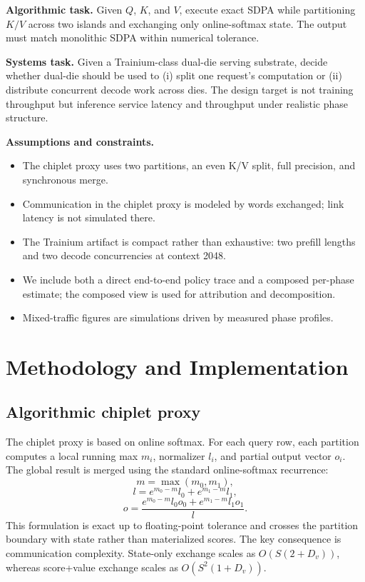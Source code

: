 \documentclass[10pt]{article}
\begin{document}
\textbf{Algorithmic task.} Given $Q$, $K$, and $V$, execute exact SDPA while partitioning $K/V$ across two islands and exchanging only online-softmax state. The output must match monolithic SDPA within numerical tolerance.

\textbf{Systems task.} Given a Trainium-class dual-die serving substrate, decide whether dual-die should be used to (i) split one request's computation or (ii) distribute concurrent decode work across dies. The design target is not training throughput but inference service latency and throughput under realistic phase structure.

\textbf{Assumptions and constraints.}
\begin{itemize}[leftmargin=1.3em]
  \item The chiplet proxy uses two partitions, an even K/V split, full precision, and synchronous merge.
  \item Communication in the chiplet proxy is modeled by words exchanged; link latency is not simulated there.
  \item The Trainium artifact is compact rather than exhaustive: two prefill lengths and two decode concurrencies at context 2048.
  \item We include both a direct end-to-end policy trace and a composed per-phase estimate; the composed view is used for attribution and decomposition.
  \item Mixed-traffic figures are simulations driven by measured phase profiles.
\end{itemize}

\section{Methodology and Implementation}
\subsection{Algorithmic chiplet proxy}
The chiplet proxy is based on online softmax. For each query row, each partition computes a local running max $m_i$, normalizer $l_i$, and partial output vector $o_i$. The global result is merged using the standard online-softmax recurrence:
\begin{equation}
  m = \max(m_0, m_1),
\end{equation}
\begin{equation}
  l = e^{m_0-m} l_0 + e^{m_1-m} l_1,
\end{equation}
\begin{equation}
  o = \frac{e^{m_0-m} l_0 o_0 + e^{m_1-m} l_1 o_1}{l}.
\end{equation}
This formulation is exact up to floating-point tolerance and crosses the partition boundary with state rather than materialized scores. The key consequence is communication complexity. State-only exchange scales as $O(S(2 + D_v))$, whereas score+value exchange scales as $O(S^2(1 + D_v))$.
\end{document}
